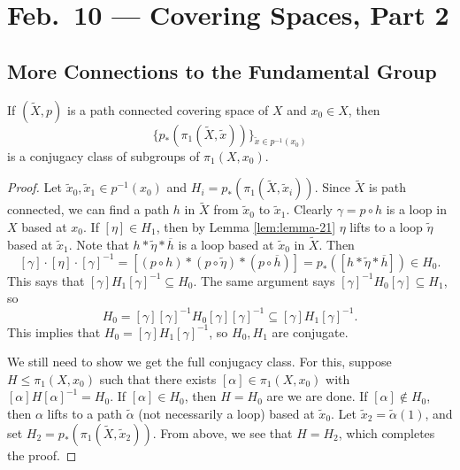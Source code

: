 \chapter{Feb.~10 --- Covering Spaces, Part 2}

\section{More Connections to the Fundamental Group}

\begin{lemma}\label{lem:lemma-22}
  If $(\widetilde{X}, p)$ is a path connected covering
  space of $X$ and $x_0 \in X$, then
  \[
    \{p_*(\pi_1(\widetilde{X}, \widetilde{x}))\}_{\widetilde{x} \in p^{-1}(x_0)}
  \]
  is a conjugacy class of subgroups of $\pi_1(X, x_0)$.
\end{lemma}

\begin{proof}
  Let $\widetilde{x}_0, \widetilde{x}_1 \in p^{-1}(x_0)$
  and $H_i = p_*(\pi_1(\widetilde{X}, \widetilde{x}_i))$.
  Since $\widetilde{X}$ is path connected, we can find a
  path $h$ in $\widetilde{X}$ from $\widetilde{x}_0$ to
  $\widetilde{x}_1$. Clearly $\gamma = p \circ h$ is a
  loop in $X$ based at $x_0$. If $[\eta] \in H_1$, then by
  Lemma \ref{lem:lemma-21} $\eta$ lifts to a loop
  $\widetilde{\eta}$ based at $\widetilde{x}_1$.
  Note that $h * \widetilde{\eta} * \overline{h}$ is a
  loop based at $\widetilde{x}_0$ in $\widetilde{X}$. Then
  \[
    [\gamma] \cdot [\eta] \cdot [\gamma]^{-1}
    = [(p \circ h) * (p \circ \widetilde{\eta}) * (p \circ \overline{h})]
    = p_*([h * \widetilde{\eta} * \overline{h}])
    \in H_0.
  \] 
  This says that $[\gamma] H_1 [\gamma]^{-1} \subseteq H_0$.
  The same argument says
  $[\gamma]^{-1} H_0 [\gamma] \subseteq H_1$, so
  \[
    H_0 = [\gamma] [\gamma]^{-1} H_0 [\gamma] [\gamma]^{-1}
    \subseteq [\gamma] H_1 [\gamma]^{-1}.
  \]
  This implies that $H_0 = [\gamma] H_1 [\gamma]^{-1}$, so
  $H_0, H_1$ are conjugate.

  We still need to show we
  get the full conjugacy class.
  For this, suppose $H \le \pi_1(X, x_0)$ such that
  there exists $[\alpha] \in \pi_1(X, x_0)$ with
  $[\alpha] H [\alpha]^{-1} = H_0$. If $[\alpha] \in H_0$,
  then $H = H_0$ are we are done. If $[\alpha] \notin H_0$,
  then $\alpha$ lifts to a path $\widetilde{\alpha}$ (not
  necessarily a loop) based at $\widetilde{x}_0$.
  Let $\widetilde{x}_2 = \widetilde{\alpha}(1)$, and set
  $H_2 = p_*(\pi_1(\widetilde{X}, \widetilde{x}_2))$.
  From above, we see that $H = H_2$, which completes the
  proof.
\end{proof}

